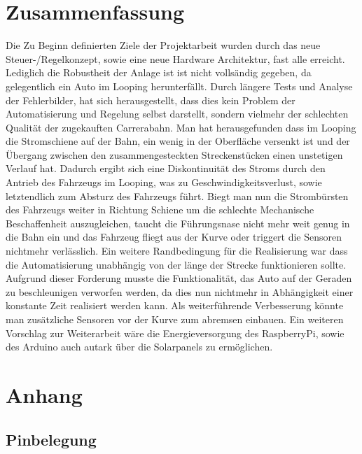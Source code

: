 \documentclass[a4paper, 11pt]{report}
\begin{document}
\chapter{Zusammenfassung}
Die Zu Beginn definierten Ziele der Projektarbeit wurden durch das neue Steuer-/Regelkonzept, sowie eine neue Hardware Architektur, fast alle erreicht. Lediglich die Robustheit der Anlage ist ist nicht vollsändig gegeben, da gelegentlich ein Auto im Looping herunterfällt.
Durch längere Tests und Analyse der Fehlerbilder, hat sich herausgestellt, dass dies kein Problem der Automatisierung und Regelung selbst darstellt, sondern vielmehr der schlechten Qualität der zugekauften Carrerabahn.
Man hat herausgefunden dass im Looping die Stromschiene auf der Bahn, ein wenig in der Oberfläche versenkt ist und der Übergang zwischen den zusammengesteckten Streckenstücken einen unstetigen Verlauf hat. Dadurch ergibt sich eine Diskontinuität des Stroms durch den Antrieb des Fahrzeugs im Looping, was zu Geschwindigkeitsverlust, sowie letztendlich zum Absturz des Fahrzeugs führt. Biegt man nun die Strombürsten des Fahrzeugs weiter in Richtung Schiene um die schlechte Mechanische Beschaffenheit auszugleichen, taucht die Führungsnase nicht mehr weit genug in die Bahn ein und das Fahrzeug fliegt aus der Kurve oder triggert die Sensoren nichtmehr verlässlich.
Ein weitere Randbedingung für die Realisierung war dass die Automatisierung unabhängig von der länge der Strecke funktionieren sollte.
Aufgrund dieser Forderung musste die Funktionalität, das Auto auf der Geraden zu beschleunigen verworfen werden, da dies nun nichtmehr in Abhängigkeit einer konstante Zeit realisiert werden kann. Als weiterführende Verbesserung könnte man zusätzliche Sensoren vor der Kurve zum abremsen einbauen.
Ein weiteren Vorschlag zur Weiterarbeit wäre die Energieversorgung des RaspberryPi, sowie des Arduino auch autark über die Solarpanels zu ermöglichen.


\chapter{Anhang}
\section{Pinbelegung}
\end{document}
